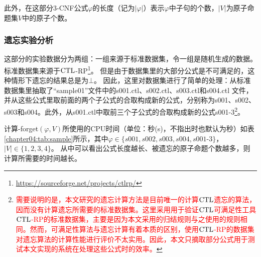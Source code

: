 	此外，在这部分3-CNF公式$\varphi$的长度（记为$|\varphi|$）表示$\varphi$中子句的个数，$|V|$为原子命题集$V$中的原子个数。

\subsubsection{遗忘实验分析}
这部分的实验数据分为两组：一组来源于标准数据集，令一组是随机生成的数据。
标准数据集来源于$\textrm{CTL}$-RP\footnote{\url{https://sourceforge.net/projects/ctlrp/}}。 但是由于数据集里的大部分公式是不可满足的，这种情形下遗忘的结果总是为$\bot$。 因此，这里对数据集进行了简单的处理：从标准数据集里抽取了“sample01”文件中的s001.ctl、s002.ctl、s003.ctl和s004.ctl 文件，并从这些公式里取前面的两个子公式的合取构成新的公式，分别称为s001、s002、s003和s004。此外，从s001.ctl中取前三个子公式的合取构成新的公式s001-3\footnote{\textcolor{red}{需要说明的是，本文研究的遗忘计算方法是目前唯一的计算$\textrm{CTL}$遗忘的算法，因而没有计算遗忘所需要的标准数据集。这里采用用于验证$\textrm{CTL}$可满足性工具$\textrm{CTL}$-RP的标准数据集，主要是因为本文采用的归结规则与之使用的规则相同。然而，可满足性算法与遗忘计算有着本质的区别，使用$\textrm{CTL}$-RP的数据集对遗忘算法的计算性能进行评价不太实用。因此，本文只摘取部分公式用于测试本文实现的系统在处理这些公式时的效率。}}。

计算{\CTL-forget}$(\varphi, V)$所使用的CPU时间（单位：秒(s)，不指出时也默认为秒）如表\ref{chapter04:tab:sample}所示，其中$\varphi\in \{s001,s002,s003,s004,s001$-$3\}$，$|V|\in \{1,2,3,4\}$。
从中可以看出公式长度越长、被遗忘的原子命题个数越多，则计算所需要的时间越长。

\begin{table}%
	\small
	\centering
	\caption{计算 {\CTL-forget}$(\varphi, V)$所使用的CPU 时间（单位：秒(s)）}\label{chapter04:tab:sample}
\end{table}

